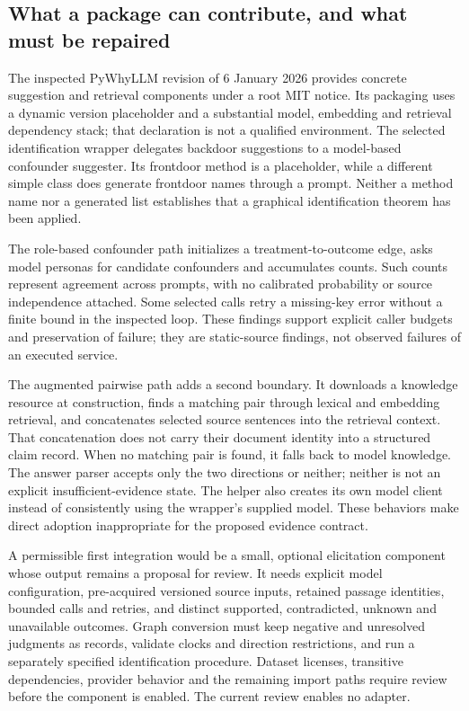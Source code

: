 \hypertarget{what-a-package-can-contribute-and-what-must-be-repaired}{%
\subsection{What a package can contribute, and what must be
repaired}\label{what-a-package-can-contribute-and-what-must-be-repaired}}

The inspected PyWhyLLM revision of 6 January 2026 provides concrete
suggestion and retrieval components under a root MIT notice. Its
packaging uses a dynamic version placeholder and a substantial model,
embedding and retrieval dependency stack; that declaration is not a
qualified environment. The selected identification wrapper delegates
backdoor suggestions to a model-based confounder suggester. Its
frontdoor method is a placeholder, while a different simple class does
generate frontdoor names through a prompt. Neither a method name nor a
generated list establishes that a graphical identification theorem has
been applied. \citep{exec14_expert_pywhy}

The role-based confounder path initializes a treatment-to-outcome edge,
asks model personas for candidate confounders and accumulates counts.
Such counts represent agreement across prompts, with no calibrated
probability or source independence attached. Some selected calls retry a
missing-key error without a finite bound in the inspected loop. These
findings support explicit caller budgets and preservation of failure;
they are static-source findings, not observed failures of an executed
service. \citep{exec14_expert_pywhy}

The augmented pairwise path adds a second boundary. It downloads a
knowledge resource at construction, finds a matching pair through
lexical and embedding retrieval, and concatenates selected source
sentences into the retrieval context. That concatenation does not carry
their document identity into a structured claim record. When no matching
pair is found, it falls back to model knowledge. The answer parser
accepts only the two directions or neither; neither is not an explicit
insufficient-evidence state. The helper also creates its own model
client instead of consistently using the wrapper's supplied model. These
behaviors make direct adoption inappropriate for the proposed evidence
contract. \citep{exec14_expert_pywhy}

A permissible first integration would be a small, optional elicitation
component whose output remains a proposal for review. It needs explicit
model configuration, pre-acquired versioned source inputs, retained
passage identities, bounded calls and retries, and distinct supported,
contradicted, unknown and unavailable outcomes. Graph conversion must
keep negative and unresolved judgments as records, validate clocks and
direction restrictions, and run a separately specified identification
procedure. Dataset licenses, transitive dependencies, provider behavior
and the remaining import paths require review before the component is
enabled. The current review enables no adapter.

